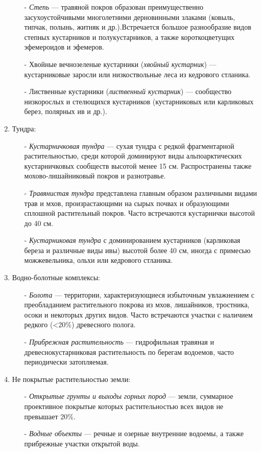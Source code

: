 \documentclass[14pt, a4paper, oneside]{extarticle}
\begin{document}
\begin{enumerate}
\begin{itemize}
        \item[-] \textit{Степь} --- травяной покров образован преимущественно засухоустойчивыми 
        многолетними дерновинными злаками (ковыль, типчак, полынь, житняк и др.).Встречается большое разнообразие видов степных кустарников и полукустарников, а также короткоцветущих эфемероидов и эфемеров.
        \item[-] Хвойные вечнозеленые кустарники (\textit{хвойный кустарник}) --- кустарниковые заросли или низкоствольные леса из кедрового стланика.
        \item[-] Лиственные кустарники (\textit{лиственный кустарник}) --- сообщество низкорослых и стелющихся кустарников (кустарниковых или карликовых берез, полярных ив и др.).
    \end{itemize}
    \item Тундра:
    \begin{itemize}
        \item[-] \textit{Кустарничковая тундра} --- сухая тундра с редкой фрагментарной растительностью, среди которой доминируют виды альпоарктических кустарничковых сообществ высотой менее 15 см. Распространены также мохово-лишайниковый покров и разнотравье.
        \item[-] \textit{Травянистая тундра} представлена главным образом различными видами трав и мхов, произрастающими на сырых почвах и образующими сплошной растительный покров. Часто встречаются кустарнички высотой до 40 см.
        \item[-] \textit{Кустарниковая тундра} с доминированием кустарников (карликовая береза и различные виды ивы) высотой более 40 см, иногда с примесью можжевельника, ольхи или кедрового стланика.
    \end{itemize}
    \item Водно-болотные комплексы:
    \begin{itemize}
        \item[-] \textit{Болота} --- территории, характеризующиеся избыточным увлажнением с преобладанием растительного покрова из мхов, лишайников, тростника, осоки и некоторых других видов. Часто встречаются участки с наличием редкого (<20\%) древесного полога.
        \item[-] \textit{Прибрежная растительность} --- гидрофильная травяная и древеснокустарниковая растительность по берегам водоемов, часто периодически затопляемая.
    \end{itemize}
    \item Не покрытые растительностью земли:
    \begin{itemize}
        \item[-] \textit{Открытые грунты и выходы горных пород} --- земли, суммарное проективное покрытые которых растительностью всех видов не превышает 20\%.
        \item[-] \textit{Водные объекты} --- речные и озерные внутренние водоемы, а также прибрежные участки открытой воды.
    \end{itemize}
\end{enumerate}
\end{document}
